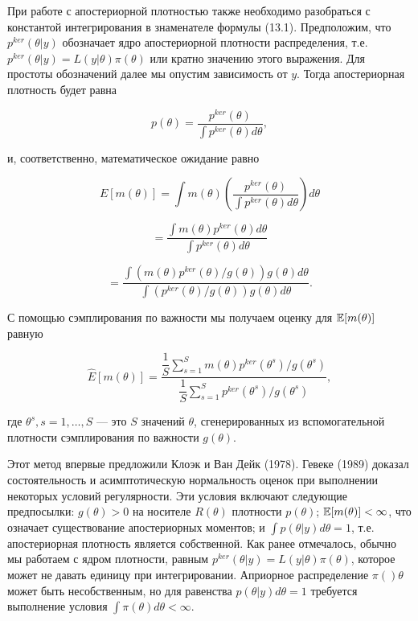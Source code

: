 При работе с апостериорной плотностью также необходимо разобраться с  константой интегрирования в знаменателе формулы (13.1). Предположим, что $p^{ker}(\theta|y)$ обозначает ядро апостериорной плотности распределения, т.е. $p^{ker}(\theta|y)=L(y|\theta)\pi(\theta)$ или кратно значению этого выражения. Для простоты обозначений далее мы опустим зависимость от $y$. Тогда апостериорная плотность будет равна

\[
p(\theta)=\dfrac{p^{ker}(\theta)}{\int{p^{ker}(\theta)d\theta}},
\]

и, соответственно, математическое ожидание равно

\[
E[m(\theta)]=\int{m(\theta)\left(\dfrac{p^{ker}(\theta)}{\int{p^{ker}(\theta)d\theta}}\right)d\theta}
\]

\[
=\frac{\int m(\theta)p^{ker}(\theta)d\theta}{{\int}p^{ker}(\theta)d\theta}
\]

\[
=\dfrac{{\int}(m(\theta)p^{ker}(\theta)/g(\theta))g(\theta)d\theta}{{\int}(p^{ker}(\theta)/g(\theta))g(\theta)d\theta}.
\]

С помощью сэмплирования по важности мы получаем оценку для $\mathbb{E}[m(\theta)]$ равную

\begin{equation}
\hat{E}[m(\theta)]=\dfrac{\dfrac{1}{S}\sum^{S}_{s=1}m(\theta)p^{ker}(\theta^s)/g(\theta^s)}{\dfrac{1}{S}\sum^{S}_{s=1} p^{ker}(\theta^s)/g(\theta^s)},
\end{equation}

где $\theta^s, s=1,\ldots ,S$ --- это $S$ значений $\theta$, сгенерированных из вспомогательной плотности сэмплирования по важности $g(\theta)$.

Этот метод впервые предложили Клоэк и Ван Дейк (1978). Гевеке (1989) доказал состоятельность и асимптотическую нормальность оценок при выполнении некоторых условий регулярности. 
Эти условия включают следующие предпосылки: $g(\theta)>0$ на носителе $R(\theta)$ плотности $p(\theta)$; $\mathbb{E}[m(\theta)]<\infty$, что означает существование апостериорных моментов; и ${\int}p(\theta|y)d\theta=1$, т.е. апостериорная плотность является собственной. Как ранее отмечалось, обычно мы работаем с ядром  плотности, равным $p^{ker}(\theta|y)=L(y|\theta)\pi(\theta)$, которое может не давать единицу при интегрировании. 
Априорное распределение $\pi()\theta$ может быть несобственным, но для равенства $p(\theta|y)d\theta=1$ требуется выполнение условия ${\int}\pi(\theta)d\theta<\infty$.

